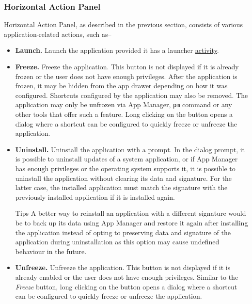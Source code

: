 \subsubsection{Horizontal Action Panel}\label{subsubsec:horizontal-action-panel} %
Horizontal Action Panel, as described in the previous section, consists of various application-related actions, such as--
\begin{itemize}
    \item \textbf{Launch.} Launch the application provided it has a launcher \hyperref[subsubsec:activities]{activity}.

    \item \textbf{Freeze.} Freeze the application. This button is not displayed if it is already frozen or the user
    does not have enough privileges. After the application is frozen, it may be hidden from the app drawer depending on
    how it was configured. Shortcuts configured by the application may also be removed. The application may only be
    unfrozen via App Manager, \texttt{pm} command or any other tools that offer such a feature. Long clicking on the
    button opens a dialog where a shortcut can be configured to quickly freeze or unfreeze the application.

    \item \textbf{Uninstall.} Uninstall the application with a prompt. In the dialog prompt, it is possible to uninstall
    updates of a system application, or if App Manager has enough privileges or the operating system supports it, it is
    possible to uninstall the application without clearing its data and signature. For the latter case, the installed
    application must match the signature with the previously installed application if it is installed again.
    \begin{tip}{Tips}
        A better way to reinstall an application with a different signature would be to back up its data using App
        Manager and restore it again after installing the application instead of opting to preserving data and signature
        of the application during uninstallation as this option may cause undefined behaviour in the future.
    \end{tip}

    \item \textbf{Unfreeze.} Unfreeze the application. This button is not displayed if it is already enabled or the user
    does not have enough privileges. Similar to the \textit{Freeze} button, long clicking on the button opens a dialog
    where a shortcut can be configured to quickly freeze or unfreeze the application.


\end{itemize}
